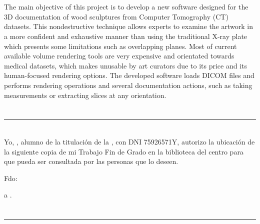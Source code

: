 \vspace{0.7cm}
\\

\vspace{0.7cm}
\\

The main objective of this project is to develop a new software designed for the 3D documentation of wood sculptures from Computer Tomography (CT) datasets. This nondestructive technique allows experts to examine the artwork in a more confident and exhaustive manner than using the traditional X-ray plate which presents some limitations such as overlapping planes. Most of current available volume rendering tools are very expensive and orientated towards medical datasets, which makes unusable by art curators due to its price and its human-focused rendering options. The developed software loads DICOM files and performs rendering operations and several documentation actions, such as taking measurements or extracting slices at any orientation.


\chapter*{}
\thispagestyle{empty}

\noindent\rule[-1ex]{\textwidth}{2pt}\\[4.5ex]

Yo, \textbf{\myName}, alumno de la titulación \myDegree de la \textbf{\myFaculty}, con DNI 75926571Y, autorizo la ubicación de la siguiente copia de mi Trabajo Fin de Grado en la biblioteca del centro para que pueda ser consultada por las personas que lo deseen.

\vspace{6cm}

\noindent Fdo: \myName

\vspace{2cm}

\begin{flushright}
\myLocation a \myTime.
\end{flushright}


\chapter*{}
\thispagestyle{empty}

\noindent\rule[-1ex]{\textwidth}{2pt}\\[4.5ex]

